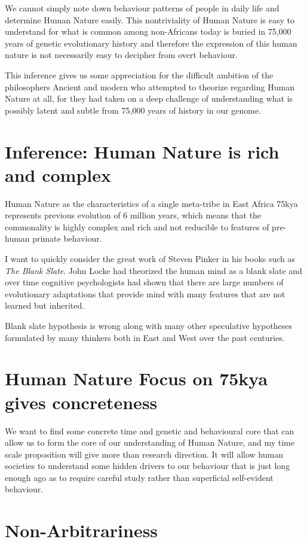 \documentclass{amsart}
\begin{document}
We cannot simply note down behaviour patterns of people in daily life and determine Human Nature easily.  This nontriviality of Human Nature is easy to understand for what is common among non-Africans today is buried in 75,000 years of genetic evolutionary history and therefore the expression of this human nature is not necessarily easy to decipher from overt behaviour.  

This inference gives us some appreciation for the difficult ambition of the philosophers Ancient and modern who attempted to theorize regarding Human Nature at all, for they had taken on a deep challenge of understanding what is possibly latent and subtle from 75,000 years of history in our genome.

\section{Inference: Human Nature is rich and complex}

Human Nature as the characteristics of a single meta-tribe in East Africa 75kya represents previous evolution of 6 million years, which means that the commonality is highly complex and rich and not reducible to features of pre-human primate behaviour.  

I want to quickly consider the great work of Steven Pinker in his books such as {\it The Blank Slate}.  John Locke had theorized the human mind as a blank slate and over time cognitive psychologists had shown that there are large numbers of evolutionary adaptations that provide mind with many features that are not learned but inherited.  

Blank slate hypothesis is wrong along with many other speculative hypotheses formulated by many thinkers both in East and West over the past centuries.  

\section{Human Nature Focus on 75kya gives concreteness}

We want to find some concrete time and genetic and behavioural core that can allow us to form the core of our understanding of Human Nature, and my time scale proposition will give more than research direction.  It will allow human societies to understand some hidden drivers to our behaviour that is just long enough ago as to require careful study rather than superficial self-evident behaviour.

\section{Non-Arbitrariness}
\end{document}
